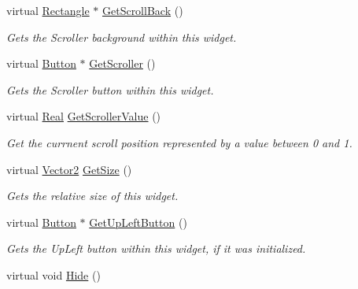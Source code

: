 \begin{DoxyCompactItemize}
virtual \hyperlink{classphys_1_1UI_1_1Rectangle}{Rectangle} $\ast$ \hyperlink{classphys_1_1UI_1_1Scrollbar_a1c24fbb88f9d86aff1b2f0abc033116a}{GetScrollBack} ()
\begin{DoxyCompactList}\small\item\em Gets the Scroller background within this widget. \item\end{DoxyCompactList}\item 
virtual \hyperlink{classphys_1_1UI_1_1Button}{Button} $\ast$ \hyperlink{classphys_1_1UI_1_1Scrollbar_a28024d2f3a017e4ed3c2a4df62a1e8be}{GetScroller} ()
\begin{DoxyCompactList}\small\item\em Gets the Scroller button within this widget. \item\end{DoxyCompactList}\item 
virtual \hyperlink{namespacephys_af7eb897198d265b8e868f45240230d5f}{Real} \hyperlink{classphys_1_1UI_1_1Scrollbar_abd70ba640ef9475a77334aa209121812}{GetScrollerValue} ()
\begin{DoxyCompactList}\small\item\em Get the currnent scroll position represented by a value between 0 and 1. \item\end{DoxyCompactList}\item 
virtual \hyperlink{classphys_1_1Vector2}{Vector2} \hyperlink{classphys_1_1UI_1_1Scrollbar_aff97ce371ee21fcf3b648dcf8b38e055}{GetSize} ()
\begin{DoxyCompactList}\small\item\em Gets the relative size of this widget. \item\end{DoxyCompactList}\item 
virtual \hyperlink{classphys_1_1UI_1_1Button}{Button} $\ast$ \hyperlink{classphys_1_1UI_1_1Scrollbar_ab298f9747da2eed451ddce8b1a416c15}{GetUpLeftButton} ()
\begin{DoxyCompactList}\small\item\em Gets the UpLeft button within this widget, if it was initialized. \item\end{DoxyCompactList}\item 
\hypertarget{classphys_1_1UI_1_1Scrollbar_aa0aa0d3441ec9c8162025a7e06ec773b}{
virtual void \hyperlink{classphys_1_1UI_1_1Scrollbar_aa0aa0d3441ec9c8162025a7e06ec773b}{Hide} ()}
\label{classphys_1_1UI_1_1Scrollbar_aa0aa0d3441ec9c8162025a7e06ec773b}


\end{DoxyCompactItemize}
